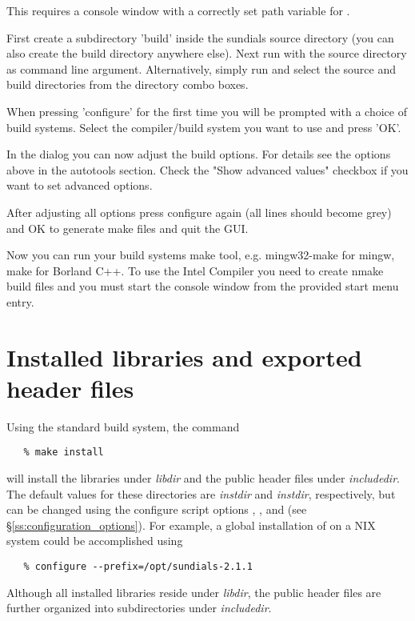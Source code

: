 This requires a console window with a correctly set path variable for .

First create a subdirectory 'build' inside the sundials source directory 
(you can also create the build directory anywhere else). Next run  with 
the  source directory as command line argument. 
Alternatively, simply run  and select the source and build directories 
from the directory combo boxes.

When pressing 'configure' for the first time you will be prompted with a choice of build systems.
Select the compiler/build system you want to use and press 'OK'. 

In the dialog you can now adjust the build options. For details see the options above in the
autotools section. Check the "Show advanced values" checkbox if you want to set advanced options. 

After adjusting all options press configure again (all lines should become grey) and OK to
generate make files and quit the GUI.

Now you can run your build systems make tool, e.g. mingw32-make for mingw, make for Borland C++.
To use the Intel Compiler you need to create nmake build files and you must start the console
window from the provided start menu entry.








\section{Installed libraries and exported header files}


Using the standard {\sundials} build system, the command
\begin{verbatim}
   % make install
\end{verbatim}
will install the libraries under {\em libdir} and the public header
files under {\em includedir}. The default values for these directories are
{\em instdir} and {\em instdir},
respectively, but can be changed using the configure script options
, ,  and  (see
\S\ref{ss:configuration_options}). For example, a global installation
of {\sundials} on a {\sc *NIX} system could be accomplished using
\begin{verbatim}
   % configure --prefix=/opt/sundials-2.1.1
\end{verbatim}
Although all installed libraries reside under {\em libdir}, the public header files
are further organized into subdirectories under {\em includedir}.

